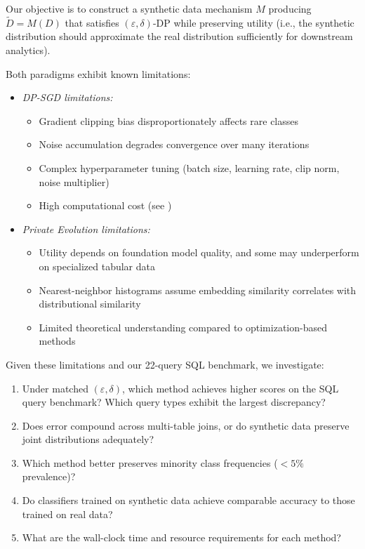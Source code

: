 \documentclass[12pt,letterpaper]{article}
\renewcommand{\_}{\textunderscore\allowbreak}
\begin{document}
Our objective is to construct a synthetic data mechanism $M$ producing $\tilde{D} = M(D)$ that satisfies $(\varepsilon, \delta)$-DP while preserving utility (i.e., the synthetic distribution should approximate the real distribution sufficiently for downstream analytics).

Both paradigms exhibit known limitations:

\begin{itemize}
    \item \textit{DP-SGD limitations:}
    \begin{itemize}
        \item Gradient clipping bias disproportionately affects rare classes
        \item Noise accumulation degrades convergence over many iterations
        \item Complex hyperparameter tuning (batch size, learning rate, clip norm, noise multiplier)
        \item High computational cost (see \citet{ghalebikesabi2023differentially})
    \end{itemize}
    
    \item \textit{Private Evolution limitations:}
    \begin{itemize}
        \item Utility depends on foundation model quality, and some may underperform on specialized tabular data
        \item Nearest-neighbor histograms assume embedding similarity correlates with distributional similarity
        \item Limited theoretical understanding compared to optimization-based methods
    \end{itemize}
\end{itemize}

Given these limitations and our 22-query SQL benchmark, we investigate:

\begin{enumerate}
    \item Under matched $(\varepsilon, \delta)$, which method achieves higher scores on the SQL query benchmark? Which query types exhibit the largest discrepancy?
    
    \item Does error compound across multi-table joins, or do synthetic data preserve joint distributions adequately?
    
    \item Which method better preserves minority class frequencies ($< 5\%$ prevalence)?
    
    \item Do classifiers trained on synthetic data achieve comparable accuracy to those trained on real data?
    
    \item What are the wall-clock time and resource requirements for each method?
\end{enumerate}
\end{document}
